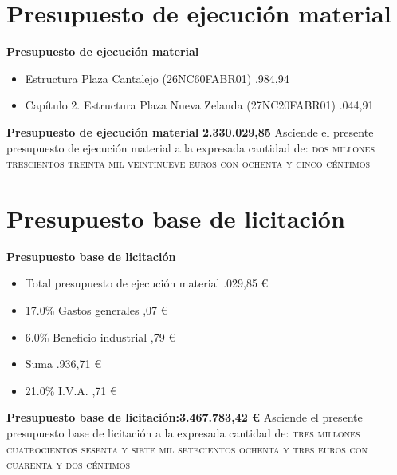 \chapter*{Presupuesto de ejecución material}%
\label{sec:Presupuestodeejecucinmaterial}%
\cleardoublepage%
\begin{center}%
\Large%
\textbf{Presupuesto de ejecución material}%
\large%
\end{center}%
\vspace*{2cm}%
\begin{itemize}%
\item%
Estructura Plaza Cantalejo (26NC60FABR01)%
.984,94%
\item%
Capítulo 2. Estructura Plaza Nueva Zelanda (27NC20FABR01)%
.044,91%
\end{itemize}%
\textbf{Presupuesto de ejecución material}%
\dotfill%
\textbf{2.330.029,85}%
\vspace*{0.5cm}%
\newline%
Asciende el presente presupuesto de ejecución material a la expresada cantidad de: %
\textsc{dos millones trescientos treinta mil veintinueve euros con ochenta y cinco céntimos}%


%
\chapter*{Presupuesto base de licitación}%
\label{sec:Presupuestobasedelicitacin}%
\cleardoublepage%
\begin{center}%
\Large%
\textbf{Presupuesto base de licitación}%
\large%
\end{center}%
\vspace*{2cm}%
\begin{itemize}%
\item%
Total presupuesto de ejecución material %
.029,85 €%
\item%
17.0\% Gastos generales %
,07 €%
\item%
6.0\% Beneficio industrial %
,79 €%
\item%
Suma %
.936,71 €%
\item%
21.0\% I.V.A. %
,71 €%
\end{itemize}%
\textbf{Presupuesto base de licitación:}\dotfill\textbf{3.467.783,42 €}%
\vspace*{0.5cm}%
\newline%
Asciende el presente presupuesto base de licitación a la expresada cantidad de: %
\textsc{tres millones cuatrocientos sesenta y siete mil setecientos ochenta y tres euros con cuarenta y dos céntimos}%


%
